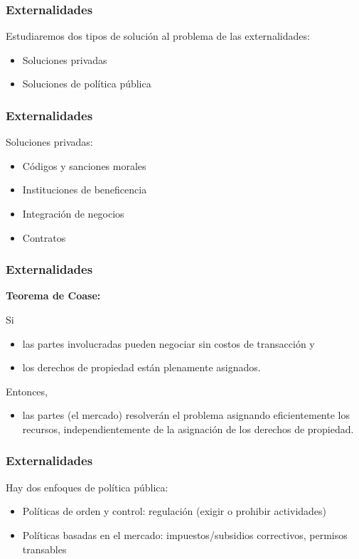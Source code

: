 \documentclass[dvipsnames,table,leqno]{beamer}
\begin{document}
		\begin{frame}
			\frametitle{Externalidades}
			Estudiaremos dos tipos de solución al problema de las externalidades:
				\begin{itemize}
					\item Soluciones privadas
					\item Soluciones de política pública
				\end{itemize}
		\end{frame}	
		
		\begin{frame}
			\frametitle{Externalidades}
			Soluciones privadas:
				\begin{itemize}
					\item Códigos y sanciones morales
					\item Instituciones de beneficencia
					\item Integración de negocios
					\item Contratos
				\end{itemize}
		\end{frame}			

		\begin{frame}
			\frametitle{Externalidades}
				\textbf{Teorema de Coase:} 
				
				\vspace{.3cm}
				Si 
					\begin{itemize}
						\item las partes involucradas pueden negociar sin costos de transacción y
						\item los derechos de propiedad están plenamente asignados.
					\end{itemize}
					Entonces,
					\begin{itemize}
						\item las partes (el mercado) resolverán el problema asignando eficientemente los recursos, independientemente de la asignación de los derechos de propiedad.
					\end{itemize}
		\end{frame}			

		\begin{frame}
			\frametitle{Externalidades}
			Hay dos enfoques de política pública:
				\begin{itemize}
					\item Políticas de orden y control: regulación (exigir o prohibir actividades)
					\item Políticas basadas en el mercado: impuestos/subsidios correctivos, permisos transables
				\end{itemize}
		\end{frame}	
\end{document}
